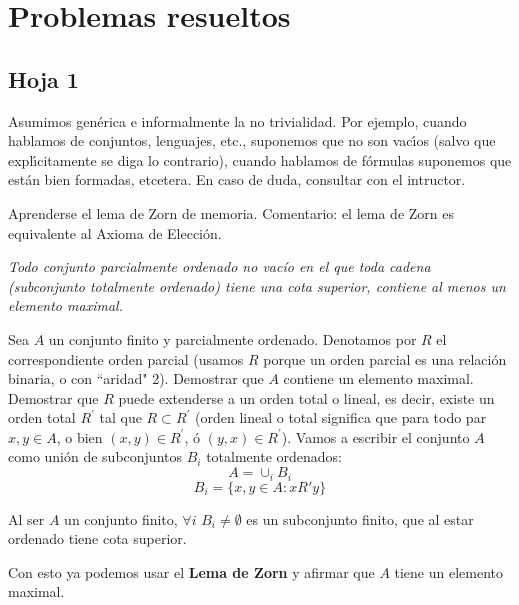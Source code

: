 \chapter{Problemas resueltos}
\section{Hoja 1}

	
	Asumimos gen\'erica e informalmente la no trivialidad. Por ejemplo,
	cuando hablamos de conjuntos, lenguajes, etc., suponemos que no  son vac\'{\i}os (salvo que 
	expl\'{\i}citamente
	se diga lo contrario),  cuando hablamos de f\'ormulas suponemos que est\'an bien formadas, etcetera.
	En caso de duda, consultar con el intructor. 
	
	\begin{problem}[1]
	Aprenderse el lema de Zorn de memoria. Comentario: el lema de Zorn es equivalente al Axioma de
	Elecci\'on.
	\solution
	
\textit{Todo conjunto parcialmente ordenado no vacío en el que toda cadena (subconjunto totalmente ordenado) tiene una cota superior, contiene al menos un elemento maximal.}
	
	
	\end{problem}
	
	\begin{problem}[2]
	Sea $A$ un conjunto finito y parcialmente ordenado. Denotamos por $R$ el correspondiente
	orden parcial (usamos $R$ porque un orden parcial es una relaci\'on binaria, o con ``aridad" 2). Demostrar que
	$A$ contiene un elemento maximal. Demostrar que $R$ puede extenderse a un orden total o lineal,
	es decir, existe un orden total  $R^\prime$ tal que $R\subset R^\prime$ (orden lineal o total
	significa que para todo par
	$x, y\in A$, o bien $(x,y)\in R^\prime$, \'o $(y,x)\in R^\prime$).
	\solution
	Vamos a escribir el conjunto $A$ como unión de subconjuntos $B_i$ totalmente ordenados:
	$$A = \cup_i B_i$$
	$$B_i = \{x,y \in A: xR'y\}$$
	
	Al ser $A$ un conjunto finito, $\forall i$ $B_i \neq \emptyset$ es un subconjunto finito, que al estar ordenado tiene cota superior.
	
	Con esto ya podemos usar el \textbf{Lema de Zorn} y afirmar que $A$ tiene un elemento maximal.
	
	
	
	
	\end{problem}
	
